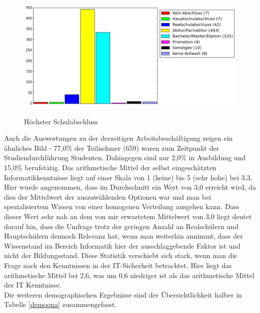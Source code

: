 \begin{figure}[H]
\centering
\includegraphics[scale=0.55]{images/schulabschluss}\\
\caption{Höchster Schulabschluss}\label{schulabschluss}
\end{figure}
Auch die Auswertungen zu der derzeitigen Arbeitsbeschäftigung zeigen ein ähnliches Bild - 77,0\% der Teilnehmer (659) waren zum Zeitpunkt der Studiendurchführung Studenten. Dahingegen sind nur 2,0\% in Ausbildung und 15,0\% berufstätig.
Das arithmetische Mittel der selbst eingeschätzten Informatikkenntnisse liegt auf einer Skala von 1 (keine) bis 5 (sehr hohe) bei 3,3. Hier wurde angenommen, dass im Durchschnitt ein Wert von 3,0 erreicht wird, da dies der Mittelwert der auszuwählenden Optionen war und man bei spezialisiertem Wissen von einer homogenen Verteilung ausgehen kann. Dass dieser Wert sehr nah an dem von mir erwartetem Mittelwert von 3,0 liegt deutet darauf hin, dass die Umfrage trotz der geringen Anzahl an Realschülern und Hauptschülern dennoch Relevanz hat, wenn man weiterhin annimmt, dass der Wissenstand im Bereich Informatik hier der ausschlaggebende Faktor ist und nicht der Bildungsstand.
Diese Statistik verschiebt sich stark, wenn man die Frage nach den Kenntnissen in der IT-Sicherheit betrachtet. Hier liegt das arithmetische Mittel bei 2,6, was um 0,6 niedriger ist als das arithmetische Mittel der IT Kenntnisse.\\
Die weiteren demographischen Ergebnisse sind der Übersichtlichkeit halber in Tabelle \ref{demoqna} zusammengefasst.\\

